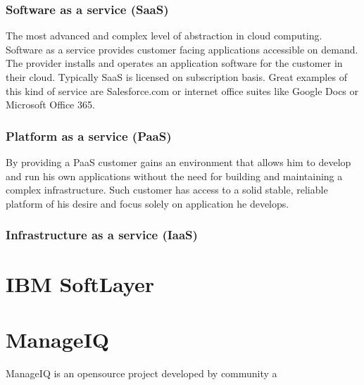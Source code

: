 \subsection{Software as a service (SaaS)}
\label{sub:Software as a service (SaaS)}


The most advanced and complex level of abstraction in cloud computing. Software as a service provides customer facing applications accessible on demand. The provider installs and operates an application software for the customer in their cloud. Typically SaaS is licensed on subscription basis. Great examples of this kind of service are Salesforce.com or internet office suites like Google Docs or Microsoft Office 365.

\subsection{Platform as a service (PaaS)}
\label{sub:Platform as a service (PaaS)}


By providing a PaaS customer gains an environment that allows him to develop and run his own applications without the need for building and maintaining a complex infrastructure. Such customer has access to a solid stable, reliable platform of his desire and focus solely on application he develops.

\subsection{Infrastructure as a service (IaaS)}
\label{sub:Infrastructure as a service (IaaS)}


\chapter{IBM SoftLayer}
\label{chap:IBM SoftLayer}

\chapter{ManageIQ}
\label{chap:ManageIQ}
ManageIQ is an opensource project developed by community a
